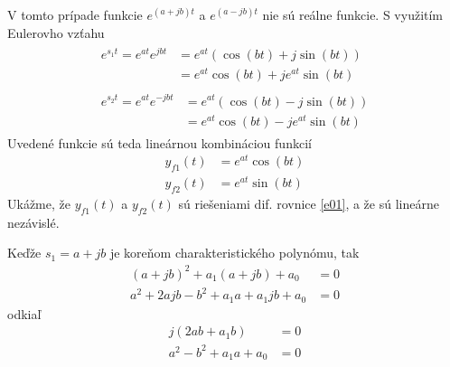 \documentclass[a4paper, 10pt, ]{article}
\begin{document}
V tomto prípade funkcie $e^{(a+jb)t}$ a $e^{(a-jb)t}$ nie sú reálne funkcie. S využitím Eulerovho vzťahu
\begin{subequations}
    \begin{align}
        \begin{split}
            e^{s_1t} = e^{at}e^{jbt} &= e^{at} \left( \cos(bt) + j \sin(bt) \right) \\
            &= e^{at} \cos(bt) + j e^{at} \sin(bt)
        \end{split} \\
        \begin{split}
            e^{s_2t} = e^{at}e^{-jbt} &= e^{at} \left( \cos(bt) - j \sin(bt) \right) \\
            &= e^{at} \cos(bt) - j e^{at} \sin(bt)
        \end{split} 
    \end{align}
\end{subequations}
Uvedené funkcie sú teda lineárnou kombináciou funkcií
\begin{subequations}
    \begin{align}
        y_{f1}(t) &= e^{at} \cos(bt) \\
        y_{f2}(t) &= e^{at} \sin(bt)
    \end{align}
\end{subequations}
Ukážme, že $y_{f1}(t)$ a $y_{f2}(t)$ sú riešeniami dif. rovnice \eqref{e01}, a že sú lineárne nezávislé.

Keďže $s_1 = a + jb$ je koreňom charakteristického polynómu, tak
\begin{subequations}
    \begin{align}
        \left( a + jb \right)^2 + a_1 \left( a + jb \right) + a_0 &= 0 \\
        a^2 + 2 a j b - b^2 + a_1 a + a_1 j b + a_0 &= 0
    \end{align}
\end{subequations}
odkiaľ
\begin{subequations}
    \begin{align}
        j \left( 2 a b + a_1 b \right) &= 0  \label{mv1} \\
        a^2 - b^2 + a_1a + a_0 &= 0 \label{mv2}
    \end{align}
\end{subequations}
\end{document}
